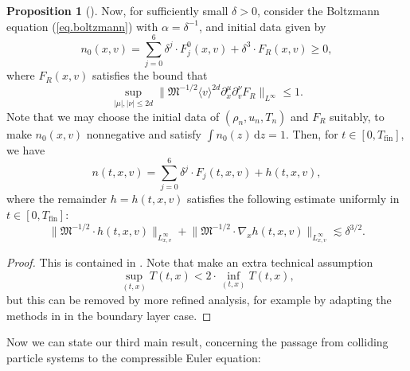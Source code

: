 \documentclass[10pt, reqno]{amsart}
\newcommand{\Mf}{\mathfrak M}
\theoremstyle{definition}
\newtheorem{proposition}[theorem]{Proposition}
\theoremstyle{remark}
\numberwithin{equation}{section}
\begin{document}
\begin{proposition}[\cite{Caf80,GJJ10,JLT21}]
Now, for sufficiently small $\delta>0$, consider the Boltzmann equation (\ref{eq.boltzmann}) with $\alpha=\delta^{-1}$, and initial data given by
\begin{equation}\label{eq.boltzmann_euler_1}
n_0(x,v)=\sum_{j=0}^6\delta^j\cdot F_j^0(x,v)+\delta^3\cdot F_R(x,v)\geq 0,
\end{equation} where $F_R(x,v)$ satisfies the bound that
\begin{equation}\label{eq.boltzmann_euler_2}
\sup_{|\mu|,|\nu|\leq 2d}\big\|\Mf^{-1/2}\langle v\rangle^{2d}\partial_x^\mu\partial_v^\nu F_R\big\|_{L^\infty}\leq 1.
\end{equation} Note that we may choose the initial data of $(\rho_n,u_n,T_n)$ and $F_R$ suitably, to make $n_0(x,v)$ nonnegative and satisfy $\int n_0(z)\,\mathrm{d}z=1$. Then, for $t\in[0,T_{\mathrm{fin}}]$, we have
\begin{equation}\label{eq.boltzmann_euler_3}
n(t,x,v)=\sum_{j=0}^6\delta^j\cdot F_j(t,x,v)+h(t,x,v),
\end{equation} where the remainder $h=h(t,x,v)$ satisfies the following estimate uniformly in $t\in[0,T_{\mathrm{fin}}]$:
\begin{equation}\label{eq.boltzmann_euler_4}
\big\|\Mf^{-1/2}\cdot h(t,x,v)\big\|_{L_{x,v}^\infty}+\big\|\Mf^{-1/2}\cdot \nabla_x h(t,x,v)\big\|_{L_{x,v}^\infty}\lesssim\delta^{3/2}.
\end{equation}
\end{proposition}
\begin{proof} This is contained in \cite{GJJ10}. Note that \cite{GJJ10} make an extra technical assumption 
\begin{equation*}
\sup_{(t,x)}T(t,x)<2\cdot\inf_{(t,x)}T(t,x),
\end{equation*} but this can be removed by more refined analysis, for example by adapting the methods in \cite{JLT21} in the boundary layer case.
\end{proof}
Now we can state our third main result, concerning the passage from colliding particle systems to the compressible Euler equation:
\end{document}
